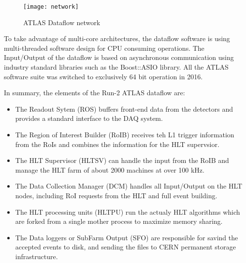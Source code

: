 \begin{figure}[t!]
\centering
\texttt{[image: network]} 
\vspace{-1cm}
\caption{ATLAS Dataflow network}
\label{fig:net_diagram}
\end{figure} 

To take advantage of multi-core architectures, the dataflow
 software is using multi-threaded software design for CPU consuming operations.
The Input/Output of the dataflow is based on asynchronous communication using industry standard libraries
such as the Boost::ASIO library. All the ATLAS software suite was switched to exclusively 64 bit operation in 2016.



In summary, the elements of the Run-2 ATLAS dataflow are:

\begin{itemize}
\item The Readout Sytem (ROS) buffers front-end data from the detectors and provides a standard interface to the DAQ system.
\item The Region of Interest Builder (RoIB) receives teh L1 trigger information from the RoIs and combines the information for the HLT supervsior.
\item The HLT Supervisor (HLTSV) can handle the input from the RoIB and manage the HLT farm of about 2000 machines at over 100 kHz.
\item The Data Collection Manager (DCM) handles all Input/Output on the HLT nodes, including RoI requests from the HLT and full event building.
\item The HLT processing units (HLTPU) run the actualy HLT algorithms which 
are forked from a single mother process to maximize memory sharing.
\item The Data loggers or SubFarm Output (SFO) are responsible for savind the 
accepted events to disk, and sending the files to CERN permanent storage infrastructure.
\end{itemize}
